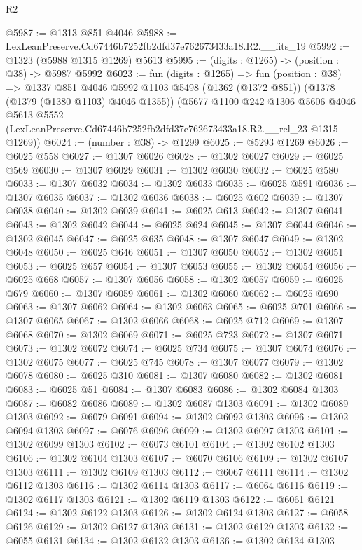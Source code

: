 \begin{lexlean}{R2}
\begin{coremodule}
@5987 := @1313 @851 @4046
@5988 := LexLeanPreserve.Cd67446b7252fb2dfd37e762673433a18.R2.__fits_19
@5992 := @1323 (@5988 @1315 @1269) @5613
@5995 := (digits : @1265) -> (position : @38) -> @5987 @5992
@6023 := fun (digits : @1265) =>
  fun (position : @38) =>
  @1337
    @851
    @4046
    @5992
    @1103
    @5498
    (@1362 (@1372 @851))
    (@1378 (@1379 (@1380 @1103) @4046 @1355))
    (@5677
      @1100
      @242
      @1306
      @5606
      @4046
      @5613
      @5552
      (LexLeanPreserve.Cd67446b7252fb2dfd37e762673433a18.R2.__rel_23 @1315 @1269))
@6024 := (number : @38) -> @1299
@6025 := @5293 @1269
@6026 := @6025 @558
@6027 := @1307 @6026
@6028 := @1302 @6027
@6029 := @6025 @569
@6030 := @1307 @6029
@6031 := @1302 @6030
@6032 := @6025 @580
@6033 := @1307 @6032
@6034 := @1302 @6033
@6035 := @6025 @591
@6036 := @1307 @6035
@6037 := @1302 @6036
@6038 := @6025 @602
@6039 := @1307 @6038
@6040 := @1302 @6039
@6041 := @6025 @613
@6042 := @1307 @6041
@6043 := @1302 @6042
@6044 := @6025 @624
@6045 := @1307 @6044
@6046 := @1302 @6045
@6047 := @6025 @635
@6048 := @1307 @6047
@6049 := @1302 @6048
@6050 := @6025 @646
@6051 := @1307 @6050
@6052 := @1302 @6051
@6053 := @6025 @657
@6054 := @1307 @6053
@6055 := @1302 @6054
@6056 := @6025 @668
@6057 := @1307 @6056
@6058 := @1302 @6057
@6059 := @6025 @679
@6060 := @1307 @6059
@6061 := @1302 @6060
@6062 := @6025 @690
@6063 := @1307 @6062
@6064 := @1302 @6063
@6065 := @6025 @701
@6066 := @1307 @6065
@6067 := @1302 @6066
@6068 := @6025 @712
@6069 := @1307 @6068
@6070 := @1302 @6069
@6071 := @6025 @723
@6072 := @1307 @6071
@6073 := @1302 @6072
@6074 := @6025 @734
@6075 := @1307 @6074
@6076 := @1302 @6075
@6077 := @6025 @745
@6078 := @1307 @6077
@6079 := @1302 @6078
@6080 := @6025 @310
@6081 := @1307 @6080
@6082 := @1302 @6081
@6083 := @6025 @51
@6084 := @1307 @6083
@6086 := @1302 @6084 @1303
@6087 := @6082 @6086
@6089 := @1302 @6087 @1303
@6091 := @1302 @6089 @1303
@6092 := @6079 @6091
@6094 := @1302 @6092 @1303
@6096 := @1302 @6094 @1303
@6097 := @6076 @6096
@6099 := @1302 @6097 @1303
@6101 := @1302 @6099 @1303
@6102 := @6073 @6101
@6104 := @1302 @6102 @1303
@6106 := @1302 @6104 @1303
@6107 := @6070 @6106
@6109 := @1302 @6107 @1303
@6111 := @1302 @6109 @1303
@6112 := @6067 @6111
@6114 := @1302 @6112 @1303
@6116 := @1302 @6114 @1303
@6117 := @6064 @6116
@6119 := @1302 @6117 @1303
@6121 := @1302 @6119 @1303
@6122 := @6061 @6121
@6124 := @1302 @6122 @1303
@6126 := @1302 @6124 @1303
@6127 := @6058 @6126
@6129 := @1302 @6127 @1303
@6131 := @1302 @6129 @1303
@6132 := @6055 @6131
@6134 := @1302 @6132 @1303
@6136 := @1302 @6134 @1303

\end{coremodule}
\end{lexlean}
